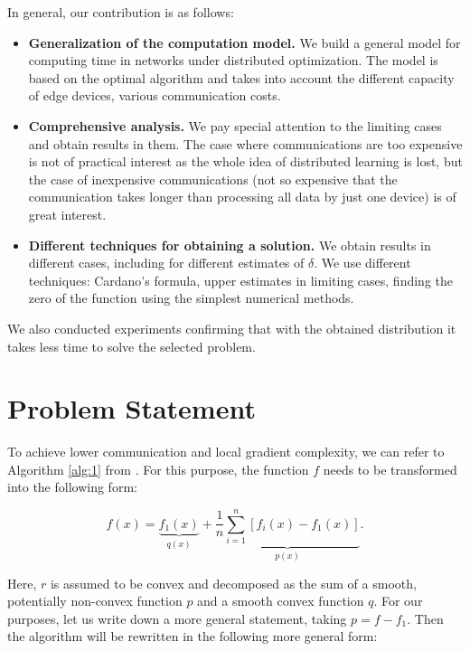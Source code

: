 \documentclass{article}
\begin{document}
In general, our contribution is as follows:
\begin{itemize}
    \item \textbf{Generalization of the computation model.} We build a general model for computing time in networks under distributed optimization. The model is based on the optimal algorithm \cite{kovalev2022optimal} and takes into account the different capacity of edge devices, various communication costs.
    \item \textbf{Comprehensive analysis.} We pay special attention to the limiting cases and obtain results in them. The case where communications are too expensive is not of practical interest as the whole idea of distributed learning is lost, but the case of inexpensive communications (not so expensive that the communication takes longer than processing all data by just one device) is of great interest. 
    \item \textbf{Different techniques for obtaining a solution.} We obtain results in different cases, including for different estimates of $\delta$. We use different techniques: Cardano's formula, upper estimates in limiting cases, finding the zero of the function using the simplest numerical methods.
\end{itemize}
 We also conducted experiments confirming that with the obtained distribution it takes less time to solve the selected problem.

\section{Problem Statement}

To achieve lower communication and local gradient complexity, we can refer to Algorithm \ref{alg:1} from \cite{kovalev2022optimal}. For this purpose, the function $f$ needs to be transformed into the following form:

\begin{equation}
    \label{eq:2}
    f(x) = \underbrace{f_1(x)}_{q(x)} + \underbrace{\frac{1}{n}\sum\limits_{i = 1}^{n}[f_i(x) - f_1(x)]}_{p(x)}.
\end{equation}

Here, $r$ is assumed to be convex and decomposed as the sum of a smooth, potentially non-convex function $p$ and a smooth convex function $q$. For our purposes, let us write down a more general statement, taking $p = f - f_1$. Then the algorithm will be rewritten in the following more general form:
\end{document}
